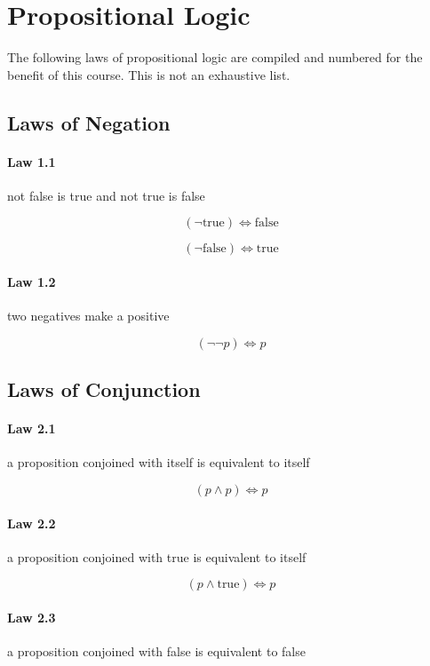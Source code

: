 \documentclass[twocolumn]{article}
\begin{document}
\section{Propositional Logic}

The following laws of propositional logic are compiled and numbered for the benefit of this course. This is not an exhaustive list.

\subsection{Laws of Negation}

\paragraph{Law 1.1} not false is true and not true is false

$$ ( \neg \text{true})  \iff  \text{false} $$

$$ ( \neg \text{false})  \iff  \text{true} $$

\paragraph{Law 1.2} two negatives make a positive

$$ ( \neg  \neg p)  \iff  p $$

\subsection{Laws of Conjunction}

\paragraph{Law 2.1} a proposition conjoined with itself is equivalent to itself

$$ (p  \wedge  p)  \iff  p $$

\paragraph{Law 2.2} a proposition conjoined with true is equivalent to itself

$$ (p  \wedge  \text{true})  \iff  p $$

\paragraph{Law 2.3} a proposition conjoined with false is equivalent to false
\end{document}
